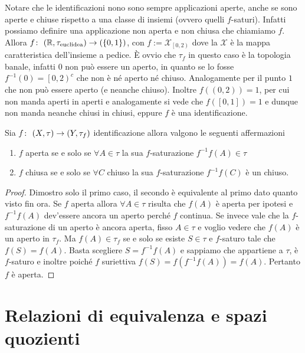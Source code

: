 \begin{remark}
	Notare che le identificazioni nono sono sempre applicazioni aperte, anche se sono aperte e chiuse rispetto a una classe di insiemi (ovvero quelli $f$-saturi). Infatti possiamo definire una applicazione non aperta e non chiusa che chiamiamo $f$. Allora $f \colon\ (\mathbb{R}, \tau_{\text{euclidea}}) \rightarrow (\{0,1\})$, con $f := \mathcal{X}_{\left[0,2\right)}$ dove la $\mathcal{X}$ è la mappa caratteristica dell'insieme a pedice. È ovvio che $\tau_f$ in questo caso è la topologia banale, infatti $0$ non può essere un aperto, in quanto se lo fosse $f^{-1}(0) = \left[0, 2\right)^c$ che non  è né aperto né chiuso. Analogamente per il punto $1$ che non può essere aperto (e neanche chiuso). Inoltre $f((0,2)) = 1$, per cui non manda aperti in aperti e analogamente si vede che $f(\left[0,1\right]) = 1$ e dunque non manda neanche chiusi in chiusi, eppure $f$ è una identificazione.
\end{remark}

\begin{theorem}
	Sia $f \colon\ (X,\tau) \rightarrow (Y, \tau_f)$ identificazione allora valgono le seguenti affermazioni
	\begin{enumerate}
		\item $f$ aperta se e solo se $\forall A \in \tau$ la sua $f$-saturazione $f^{-1}f(A) \in \tau$
		\item $f$ chiusa se e solo se $\forall C$ chiuso la sua $f$-saturazione $f^{-1}f(C)$ è un chiuso.
	\end{enumerate}
\end{theorem}
\begin{proof}
	Dimostro solo il primo caso, il secondo è equivalente al primo dato quanto visto fin ora. Se $f$ aperta allora $\forall A \in \tau$ risulta che $f(A)$ è aperta per ipotesi e $f^{-1}f(A)$ dev'essere ancora un aperto perché $f$ continua. Se invece vale che la $f$-saturazione di un aperto è ancora aperta, fisso $A \in \tau$ e voglio vedere che $f(A)$ è un aperto in $\tau_f$. Ma $f(A) \in \tau_f$ se e solo se esiste $S \in \tau$ e $f$-saturo tale che $f(S) = f(A)$. Basta scegliere $S = f^{-1}f(A)$ e sappiamo che appartiene a $\tau$, è $f$-saturo e inoltre poiché $f$ suriettiva $f(S) = f(f^{-1}f(A)) = f(A)$. Pertanto $f$ è aperta. 
\end{proof}

\section{Relazioni di equivalenza e spazi quozienti}


